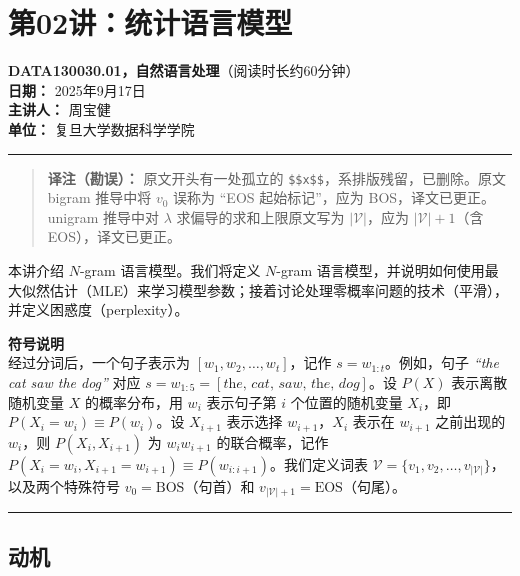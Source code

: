 \documentclass[
  11pt,
  a4paper,
]{article}
\author{}
\date{}
\begin{document}
\section{第02讲：统计语言模型}\label{ux7b2c02ux8bb2ux7edfux8ba1ux8bedux8a00ux6a21ux578b}

\textbf{DATA130030.01，自然语言处理}（阅读时长约60分钟）\\
\textbf{日期：} 2025年9月17日\\
\textbf{主讲人：} 周宝健\\
\textbf{单位：} 复旦大学数据科学学院

\begin{center}\rule{0.5\linewidth}{0.5pt}\end{center}

\begin{quote}
\textbf{译注（勘误）：} 原文开头有一处孤立的
\texttt{\$\$x\$\$}，系排版残留，已删除。原文 bigram 推导中将 \(v_0\)
误称为 ``EOS 起始标记''，应为 BOS，译文已更正。unigram 推导中对
\(\lambda\) 求偏导的求和上限原文写为 \(|\mathcal{V}|\)，应为
\(|\mathcal{V}|+1\)（含 EOS），译文已更正。
\end{quote}

本讲介绍 \(N\)-gram 语言模型。我们将定义 \(N\)-gram
语言模型，并说明如何使用最大似然估计（MLE）来学习模型参数；接着讨论处理零概率问题的技术（平滑），并定义困惑度（perplexity）。

\textbf{符号说明}\\
经过分词后，一个句子表示为 \([w_1, w_2, \ldots, w_t]\)，记作
\(s = w_{1:t}\)。例如，句子 \emph{``the cat saw the dog''} 对应
\(s = w_{1:5} = [\textit{the, cat, saw, the, dog}]\)。设 \(P(X)\)
表示离散随机变量 \(X\) 的概率分布，用 \(w_i\) 表示句子第 \(i\)
个位置的随机变量 \(X_i\)，即 \(P(X_i = w_i) \equiv P(w_i)\)。设
\(X_{i+1}\) 表示选择 \(w_{i+1}\)，\(X_i\) 表示在 \(w_{i+1}\) 之前出现的
\(w_i\)，则 \(P(X_i, X_{i+1})\) 为 \(w_i w_{i+1}\) 的联合概率，记作
\(P(X_i = w_i, X_{i+1} = w_{i+1}) \equiv P(w_{i:i+1})\)。我们定义词表
\(\mathcal{V} = \{v_1, v_2, \ldots, v_{|\mathcal{V}|}\}\)，以及两个特殊符号
\(v_0 = \text{BOS}\)（句首）和
\(v_{|\mathcal{V}|+1} = \text{EOS}\)（句尾）。

\begin{center}\rule{0.5\linewidth}{0.5pt}\end{center}

\subsection{动机}\label{ux52a8ux673a}
\end{document}
